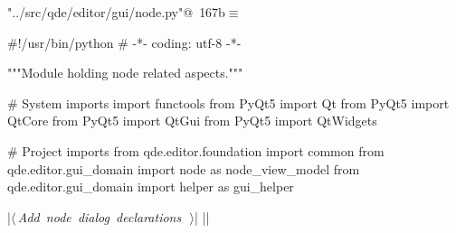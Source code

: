 \documentclass[%
    a4paper,    %
    justified,  %
    nobib,      %
    openany     %
]{tufte-book}
\begin{document}
\begin{flushleft} \small
\begin{minipage}{\linewidth}\label{scrap202}\raggedright\small
{} \verb@"../src/qde/editor/gui/node.py"@\nobreak\ {\footnotesize {167b}}$\equiv$
\vspace{-1ex}
\begin{pythoncode}
#!/usr/bin/python
# -*- coding: utf-8 -*-

"""Module holding node related aspects."""

# System imports
import functools
from PyQt5 import Qt
from PyQt5 import QtCore
from PyQt5 import QtGui
from PyQt5 import QtWidgets

# Project imports
from qde.editor.foundation import common
from qde.editor.gui_domain import node   as node_view_model
from qde.editor.gui_domain import helper as gui_helper


|\hbox{$\langle\,${\itshape Add node dialog declarations}\nobreak\ {\footnotesize {}}$\,\rangle$}|
|\NWsep|
\end{pythoncode}
\vspace{1.5ex}
\footnotesize
\begin{list}{}{\setlength{\itemsep}{-\parsep}\setlength{\itemindent}{-\leftmargin}}

\item{}
\end{list}
\end{minipage}\vspace{4ex}
\end{flushleft}
\end{document}
